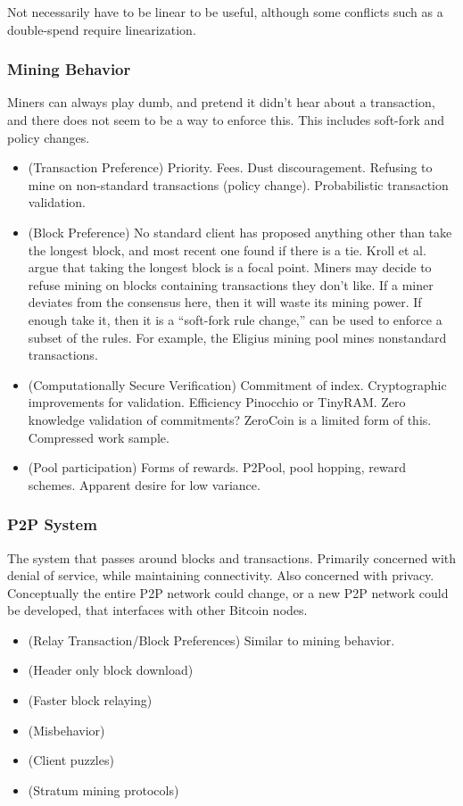 Not necessarily have to be linear to be useful, although some conflicts such as a double-spend require linearization.

\subsubsection{Mining Behavior}
Miners can always play dumb, and pretend it didn't hear about a transaction, and there does not seem to be a way to enforce this. This includes soft-fork and policy changes.
\begin{itemize}
\item (Transaction Preference) Priority. Fees. Dust discouragement. Refusing to mine on non-standard transactions (policy change). Probabilistic transaction validation.
\item (Block Preference) No standard client has proposed anything other than take the longest block, and most recent one found if there is a tie. Kroll et al. argue that taking the longest block is a focal point. Miners may decide to refuse mining on blocks containing transactions they don't like. If a miner deviates from the consensus here, then it will waste its mining power. If enough take it, then it is a ``soft-fork rule change,'' can be used to enforce a subset of the rules. For example, the Eligius mining pool mines nonstandard transactions.
\item (Computationally Secure Verification) Commitment of index. Cryptographic improvements for validation. Efficiency Pinocchio or TinyRAM. Zero knowledge validation of commitments? ZeroCoin is a limited form of this. Compressed work sample.
\item (Pool participation) Forms of rewards. P2Pool, pool hopping, reward schemes. Apparent desire for low variance.
\end{itemize}

\subsubsection{P2P System}
The system that passes around blocks and transactions. Primarily concerned with denial of service, while maintaining connectivity. Also concerned with privacy. Conceptually the entire P2P network could change, or a new P2P network could be developed, that interfaces with other Bitcoin nodes.
\begin{itemize}
\item (Relay Transaction/Block Preferences) Similar to mining behavior.
\item (Header only block download)
\item (Faster block relaying)
\item (Misbehavior)
\item (Client puzzles)
\item (Stratum mining protocols)
\end{itemize}

